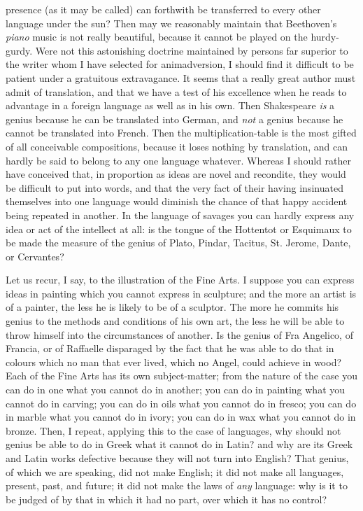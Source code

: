 presence (as it may be called) can forthwith be transferred to every
other language under the sun? Then may we reasonably maintain that
Beethoven's \emph{piano} music is not really beautiful, because it
cannot be played on the hurdy-gurdy. Were not this astonishing
doctrine maintained by persons far superior to the writer whom I have
selected for animadversion, I should find it difficult to be patient
under a gratuitous extravagance. It seems that a really great author
must admit of translation, and that we have a test of his excellence
when he reads to advantage in a foreign language as well as in his
own. Then Shakespeare \emph{is} a genius because he can be translated
into German, and \emph{not} a genius because he cannot be translated
into French. Then the multiplication-table is the most gifted of all
conceivable compositions, because it loses nothing by translation, and
can hardly be said to belong to any one language whatever. Whereas I
should rather have conceived that, in proportion as ideas are novel
and recondite, they would be difficult to put into words, and that the
very fact of their having insinuated themselves into one language
would diminish the chance of that happy accident being repeated in
another. In the language of savages you can hardly express any idea or
act of the intellect at all: is the tongue of the Hottentot or
Esquimaux to be made the measure of the genius of Plato, Pindar,
Tacitus, St. Jerome, Dante, or Cervantes?

Let us recur, I say, to the illustration of the Fine Arts. I
suppose you can express ideas in painting which you cannot express in
sculpture; and the more an artist is of a painter, the less he is
likely to be of a sculptor. The more he commits his genius to the
methods and conditions of his own art, the less he will be able to
throw himself into the circumstances of another. Is the genius of Fra
Angelico, of Francia, or of Raffaelle disparaged by the fact that he
was able to do that in colours which no man that ever lived, which no
Angel, could achieve in wood? Each of the Fine Arts has its own
subject-matter; from the nature of the case you can do in one
what you cannot do in another; you can do in painting what you cannot
do in carving; you can do in oils what you cannot do in fresco; you
can do in marble what you cannot do in ivory; you can do in wax what
you cannot do in bronze. Then, I repeat, applying this to the case of
languages, why should not genius be able to do in Greek what it cannot
do in Latin? and why are its Greek and Latin works defective because
they will not turn into English? That genius, of which we are
speaking, did not make English; it did not make all languages,
present, past, and future; it did not make the laws of \emph{any}
language: why is it to be judged of by that in which it had no part,
over which it has no control?

